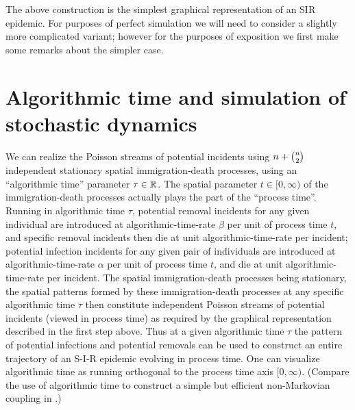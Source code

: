 \documentclass[]{article}
\newcommand{\SIR}{S-I-R\xspace}
\begin{document}
 The above construction is the simplest graphical representation of an SIR epidemic.
 For purposes of perfect simulation we will need to consider a slightly more complicated variant;
 however for the purposes of exposition we first make some remarks about the simpler case.
 
 \section{Algorithmic time and simulation of stochastic dynamics}\label{sec:algorithmic}
%
 We can realize the Poisson streams of potential incidents using \(n+\tbinom{n}{2}\) independent stationary spatial immigration-death processes, using an ``algorithmic time'' parameter \(\tau\in\mathbb{R}\).
 The spatial parameter \(t\in[0,\infty)\) of the immigration-death
 processes actually plays the part of the  ``process time''.
 Running in algorithmic time \(\tau\), potential removal incidents for any given individual are introduced at algorithmic-time-rate \(\beta\) per unit of process time \(t\), 
 and specific removal incidents then die at unit algorithmic-time-rate per incident;
 potential infection incidents for any given pair of individuals are introduced at algorithmic-time-rate \(\alpha\) per unit of process time \(t\), and die at unit algorithmic-time-rate per incident.
 The spatial immigration-death processes being stationary, the spatial patterns formed by these immigration-death processes at any specific algorithmic time \(\tau\) then constitute
 independent Poisson streams of potential incidents (viewed in process time) as required by the graphical representation described in the first step above.
 Thus at a given algorithmic time \(\tau\) the pattern of potential infections and potential removals can be used to construct an entire trajectory of an \SIR epidemic evolving in process time.
 One can visualize algorithmic time as running orthogonal to the process time axis \([0,\infty)\).
 (Compare the use of algorithmic time to construct a simple but efficient non-Markovian coupling in \citealp{BanerjeeKendall-2015}.)
\end{document}
